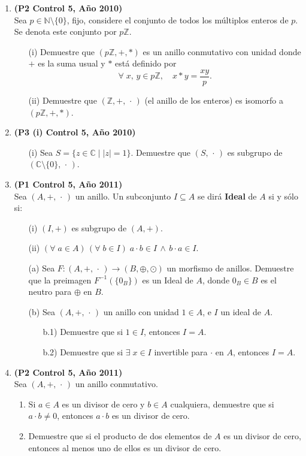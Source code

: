 \documentclass[11pt]{article}
\newcommand{\N}{\mathbb N}
\newcommand{\Z}{\mathbb Z}
\newcommand{\C}{\mathbb C}
\newcommand{\NN}{\N\setminus\{0\}}
\theoremstyle{plain}
\theoremstyle{definition}
\begin{document}
\begin{enumerate}
\item \textbf{(P2 Control 5, Año 2010)}\\
Sea $p\in\NN$, fijo, considere el conjunto de todos los múltiplos enteros de $p$. Se denota este conjunto por $p\Z$.
\begin{enumerate}
\item[(i)] Demuestre que $(p\Z,+,*)$ es un anillo conmutativo con unidad donde $+$ es la suma usual y $*$ está definido por
$$\forall\;x,\,y\in p\Z,\quad x*y=\frac{xy}{p}.$$
\item[(ii)] Demuestre que $(\Z,+,\,\cdot\,)$ (el anillo de los enteros) es isomorfo a $(p\Z,+,*)$.
\end{enumerate}

\item \textbf{(P3 (i) Control 5, Año 2010)}
\begin{enumerate}
\item[(i)] Sea $S=\{z\in\C\;|\;|z|=1\}$. Demuestre que $(S,\,\cdot\,)$ es subgrupo de $(\C\setminus\{0\},\,\cdot\,)$.
\end{enumerate}

\item \textbf{(P1 Control 5, Año 2011)}\\
Sea $(A,+,\,\cdot \,)$ un anillo. Un subconjunto $I\subseteq A$ se dirá \textbf{Ideal} de $A$ si y sólo si:
\begin{enumerate}
\item[(i)] $(I,+)$ es subgrupo de $(A,+)$.
\item[(ii)] $(\forall\;a\in A)\,(\forall\;b\in I)\; a\cdot b\in I\,\wedge\,b\cdot a\in I.$\\
\item[(a)] Sea $F:(A,+,\,\cdot\,)\longrightarrow (B,\oplus,\odot)$ un morfismo de anillos. Demuestre que la preimagen $F^{-1}(\{0_B\})$ es un Ideal de $A$, donde $0_B\in B$ es el neutro para $\oplus$ en $B$.
\item[(b)] Sea $(A,+,\,\cdot\,)$ un anillo con unidad $1\in A$, e $I$ un ideal de $A$.
\begin{enumerate}
\item[b.1)] Demuestre que si $1\in I$, entonces $I=A$.
\item[b.2)] Demuestre que si $\exists\;x\in I$ invertible para $\cdot$ en $A$, entonces $I=A$.
\end{enumerate}
\end{enumerate}

\item \textbf{(P2 Control 5, Año 2011)}\\
Sea $(A,+,\,\cdot\,)$ un anillo conmutativo.
\begin{enumerate}
\item Si $a\in A$ es un divisor de cero y $b\in A$ cualquiera, demuestre que si $a\cdot b\neq 0$, entonces $a\cdot b$ es un divisor de cero.
\item Demuestre que si el producto de dos elementos de $A$ es un divisor de cero, entonces al menos uno de ellos es un divisor de cero.
\end{enumerate}


\end{enumerate}
\end{document}
